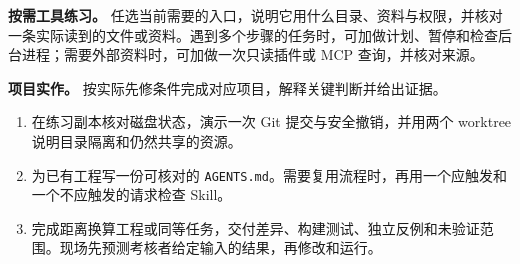 \textbf{按需工具练习。} 任选当前需要的入口，说明它用什么目录、资料与权限，并核对一条实际读到的文件或资料。遇到多个步骤的任务时，可加做计划、暂停和检查后台进程；需要外部资料时，可加做一次只读插件或 MCP 查询，并核对来源。

\textbf{项目实作。} 按实际先修条件完成对应项目，解释关键判断并给出证据。
\begin{enumerate}
  \item 在练习副本核对磁盘状态，演示一次 Git 提交与安全撤销，并用两个 worktree 说明目录隔离和仍然共享的资源。
  \item 为已有工程写一份可核对的 \texttt{AGENTS.md}。需要复用流程时，再用一个应触发和一个不应触发的请求检查 Skill。
  \item 完成距离换算工程或同等任务，交付差异、构建测试、独立反例和未验证范围。现场先预测考核者给定输入的结果，再修改和运行。
\end{enumerate}
\endgroup
